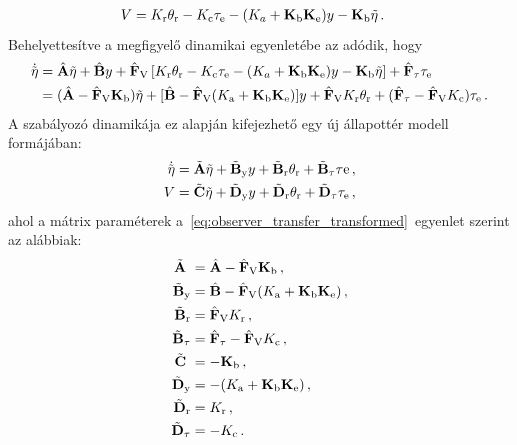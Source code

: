 \begin{equation}
    \begin{split}
        V &= K_{\mathrm{r}} \theta_{\mathrm{r}} - K_{\mathrm{c}} \tau_{\mathrm{e}} - (K_a + \mathbf{K}_{\mathrm{b}} \mathbf{K}_{\mathrm{e}}) y - \mathbf{K}_{\mathrm{b}} \tilde{\mathbf{\eta}}\,.
    \end{split}
\end{equation}
Behelyettesítve a megfigyelő dinamikai egyenletébe az adódik, hogy
\begin{align}\label{eq:observer_transfer_transformed}
    \begin{split}
        \dot{\tilde{\mathbf{\eta}}} &= \hat{\mathbf{A}} \tilde{\mathbf{\eta}} + 
        \hat{\mathbf{B}} y + 
        \hat{\mathbf{F}}_{\mathrm{V}}\left[K_{\mathrm{r}} \theta_{\mathrm{r}} - K_{\mathrm{c}} \tau_{\mathrm{e}} - (K_a + \mathbf{K}_{\mathrm{b}} \mathbf{K}_{\mathrm{e}}) y - \mathbf{K}_{\mathrm{b}} \tilde{\mathbf{\eta}}\right] + 
        \hat{\mathbf{F}}_{\mathrm{\tau}} \tau_{\mathrm{e}} \\
        &= (\hat{\mathbf{A}} - \hat{\mathbf{F}}_{\mathrm{V}} \mathbf{K}_{\mathrm{b}})\tilde{\mathbf{\eta}} + 
        [\hat{\mathbf{B}} - \hat{\mathbf{F}}_{\mathrm{V}} (K_{\mathrm{a}} + \mathbf{K}_{\mathrm{b}} \mathbf{K}_{\mathrm{e}})]y + 
        \hat{\mathbf{F}}_{\mathrm{V}} K_{\mathrm{r}} \theta_{\mathrm{r}} + 
        (\hat{\mathbf{F}}_{\mathrm{\tau}} - \hat{\mathbf{F}}_{\mathrm{V}} K_{\mathrm{c}}) \tau_{\mathrm{e}}\,.
    \end{split}
\end{align}
A szabályozó dinamikája ez alapján kifejezhető egy új állapottér modell formájában:
\begin{align}\label{eq:controller_state_space}
    \begin{split}
        \dot{\tilde{\mathbf{\eta}}} &= \tilde{\mathbf{A}}\tilde{\mathbf{\eta}} + 
        \tilde{\mathbf{B}}_{\mathrm{y}} y + 
        \tilde{\mathbf{B}}_{\mathrm{r}} \theta_{\mathrm{r}} +
        \tilde{\mathbf{B}}_{\mathrm{\tau}} \tau\mathrm{e}\,, \\
        V &= \tilde{\mathbf{C}}\tilde{\mathbf{\eta}} + 
        \tilde{\mathbf{D}}_{\mathrm{y}} y + 
        \tilde{\mathbf{D}}_{\mathrm{r}} \theta_{\mathrm{r}} + 
        \tilde{\mathbf{D}}_{\mathrm{\tau}} \tau_{\mathrm{e}}\,,
    \end{split}
\end{align}
ahol a mátrix paraméterek a~\eqref{eq:observer_transfer_transformed}~egyenlet szerint az alábbiak:
\begin{align}
    \begin{split}
        \tilde{\mathbf{A}}\ &= \hat{\mathbf{A}} - \hat{\mathbf{F}}_{\mathrm{V}} \mathbf{K}_{\mathrm{b}}\,,\\
        \tilde{\mathbf{B}}_{\mathrm{y}} &= \hat{\mathbf{B}} - \hat{\mathbf{F}}_{\mathrm{V}} (K_{\mathrm{a}} + \mathbf{K}_{\mathrm{b}} \mathbf{K}_{\mathrm{e}})\,,\\
        \tilde{\mathbf{B}}_{\mathrm{r}} &= \hat{\mathbf{F}}_{\mathrm{V}} K_{\mathrm{r}}\,, \\
        \tilde{\mathbf{B}}_{\mathrm{\tau}} &= \hat{\mathbf{F}}_{\mathrm{\tau}} - \hat{\mathbf{F}}_{\mathrm{V}} K_{\mathrm{c}}\,, \\
        \tilde{\mathbf{C}}\ &= -\mathbf{K}_{\mathrm{b}}\,, \\
        \tilde{\mathbf{D}}_{\mathrm{y}} &= -(K_{\mathrm{a}} + \mathbf{K}_{\mathrm{b}} \mathbf{K}_{\mathrm{e}})\,, \\
        \tilde{\mathbf{D}}_{\mathrm{r}} &= K_{\mathrm{r}}\,, \\
        \tilde{\mathbf{D}}_{\mathrm{\tau}} &= -K_{\mathrm{c}}\,.
    \end{split}
\end{align}
